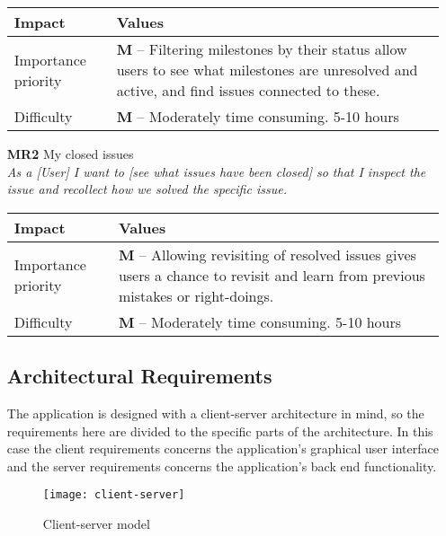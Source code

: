 \begin{itemize}
        \begin{tabular}{| l | p{7cm} |}
            \hline
            \rowcolor[gray]{0.8}
            \textbf{Impact} & \textbf{Values} \\
            \hline
            Importance priority & \textbf{M} -- Filtering milestones by their status allow users to see what milestones are unresolved and active, and find issues connected to these.\\
            Difficulty & \textbf{M} -- Moderately time consuming. 5-10 hours\\
            \hline
        \end{tabular}
    \vspace{0.5cm}

    \item[\textbf{MR2}] My closed issues\\
        \textit{\small{As a [User] I want to [see what issues have been closed] so that I inspect the issue and recollect how we solved the specific issue.}}

        \begin{tabular}{| l | p{7cm} |}
            \hline
            \rowcolor[gray]{0.8}
            \textbf{Impact} & \textbf{Values} \\
            \hline
            Importance priority & \textbf{M} -- Allowing revisiting of resolved issues gives users a chance to revisit and learn from previous mistakes or right-doings.\\
            Difficulty & \textbf{M} -- Moderately time consuming. 5-10 hours\\
            \hline
        \end{tabular}
    \vspace{0.5cm}

\subsection{Architectural Requirements}
\label{subsec:archirequire}
The application is designed with a client-server architecture in mind, so the requirements here are divided to the specific parts of the architecture. In this case the client requirements concerns the application's graphical user interface and the server requirements concerns the application's back end functionality.
\begin{figure}[H]
\centering
    \texttt{[image: client-server]}
\caption{Client-server model \citep{clientServerModel}}
\label{csrlmodel}
\end{figure}


\end{itemize}
